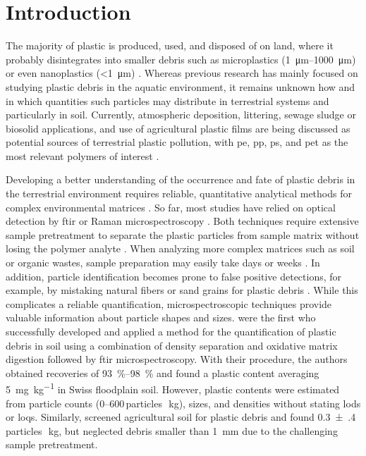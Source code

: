\section{Introduction}

The majority of plastic is produced, used, and disposed of on land, where it probably disintegrates into smaller debris such as microplastics (\SIrange{1}{1000}{\micro\meter}) or even nanoplastics (\SI{<1}{\micro\meter}) \citep{HartmannAre2019,HurleyFate2018,WagnerThings2019}. Whereas previous research has mainly focused on studying plastic debris in the aquatic environment, it remains unknown how and in which quantities such particles may distribute in terrestrial systems and particularly in soil. Currently, atmospheric deposition, littering, sewage sludge or biosolid applications, and use of agricultural plastic films are being discussed as potential sources of terrestrial plastic pollution, with \ac{pe}, \ac{pp}, \ac{ps}, and \ac{pet} as the most relevant polymers of interest \citep{HurleyFate2018,WangMicroplastics2019}.

Developing a better understanding of the occurrence and fate of plastic debris in the terrestrial environment requires reliable, quantitative analytical methods for complex environmental matrices \citep{BlasingPlastics2018,HeMicroplastics2018,daCostaMicroplastics2018}. So far, most studies have relied on optical detection by \ac{ftir} or Raman microspectroscopy \citep{RennerAnalytical2018}. Both techniques require extensive sample pretreatment to separate the plastic particles from sample matrix without losing the polymer analyte \citep{HurleyValidation2018}. When analyzing more complex matrices such as soil or organic wastes, sample preparation may easily take days or weeks \citep{LoderEnzymatic2017}. In addition, particle identification becomes prone to false positive detections, for example, by mistaking natural fibers or sand grains for plastic debris \citep{BlasingPlastics2018}. While this complicates a reliable quantification, microspectroscopic techniques provide valuable information about particle shapes and sizes. \citet{ScheurerMicroplastics2018} were the first who successfully developed and applied a method for the quantification of plastic debris in soil using a combination of density separation and oxidative matrix digestion followed by \ac{ftir} microspectroscopy. With their procedure, the authors obtained recoveries of \SIrange{93}{98}{\percent} and found a plastic content averaging \SI{5}{\milli\gram\per\kilo\gram} in Swiss floodplain soil. However, plastic contents were estimated from particle counts (\numrange{0}{600}\,particles\,\si{\per\kilo\gram}), sizes, and densities without stating \acp{lod} or \acp{loq}. Similarly, \citet{PiehlIdentification2018} screened agricultural soil for plastic debris and found \num{0.3(4)}\,particles\,\si{\per\kilo\gram}, but neglected debris smaller than \SI{1}{\milli\meter} due to the challenging sample pretreatment.

